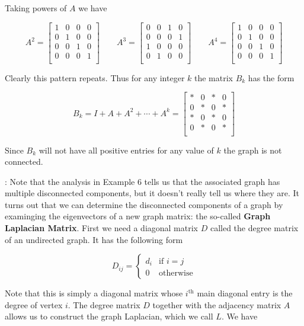 \documentclass[12pt]{article}
\newcommand{\nin}{\noindent}
\newcommand{\vthree}{\vspace{3mm}}
\newcommand{\mymat}[1]{
\left[
\begin{array}{rrrrrrrrrrrrrrrrrrrrrrrrrrrrrrrrrrrrrrr}
#1
\end{array}
\right]
}
\begin{document}
\vthree

\nin Taking powers of $A$ we have

\vthree

\[
A^2 =
\mymat{
1 & 0 & 0 & 0 \\
0 & 1 & 0 & 0 \\
0 & 0 & 1 & 0 \\
0 & 0 & 0 & 1 \\
}
\quad
\quad
A^3 =
\mymat{
0 & 0 & 1 & 0 \\
0 & 0 & 0 & 1 \\
1 & 0 & 0 & 0 \\
0 & 1 & 0 & 0 \\
}
\quad
\quad
A^4 =
\mymat{
1 & 0 & 0 & 0 \\
0 & 1 & 0 & 0 \\
0 & 0 & 1 & 0 \\
0 & 0 & 0 & 1 \\
}
\]

\vthree

\nin Clearly this pattern repeats.  Thus for any integer $k$ the matrix $B_k$ has the form

\[
B_k = I + A + A^2 + \cdots + A^k =
\mymat{
* & 0 & * & 0 \\
0 & * & 0 & * \\
* & 0 & * & 0 \\
0 & * & 0 & * \\
}
\]

\vthree

\nin Since $B_k$ will not have all positive entries for any value of $k$ the graph is not connected.

\vthree

\nin {\bf Example 7}:  Note that the analysis in Example 6 tells us that the associated graph has multiple disconnected components, but it doesn't really tell us where they are.  It turns out that we can determine the disconnected components of a graph by examinging the eigenvectors of a new graph matrix: the so-called {\bf Graph Laplacian Matrix}.  First we need a diagonal matrix $D$ called the degree matrix of an undirected graph.  It has the following form

\[
D_{ij} =
\left\{
\begin{array}{rl}
d_i & \textrm{if } i = j \\
0 & \textrm{otherwise}
\end{array}
\right.
\]

\vthree

\nin Note that this is simply a diagonal matrix whose $i^{\textrm{th}}$ main diagonal entry is the degree of vertex $i$.  The degree matrix $D$ together with the adjacency matrix $A$ allows us to construct the graph Laplacian, which we call $L$.  We have
\end{document}
